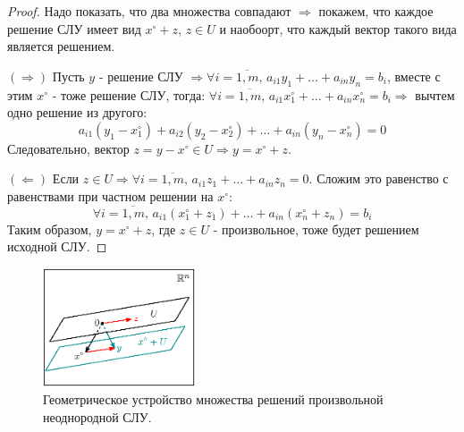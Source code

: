 \documentclass[12pt]{article}
\theoremstyle{definition}
\begin{document}
\begin{proof}
	Надо показать, что два множества совпадают $\Rightarrow$ покажем, что каждое решение СЛУ имеет вид $x^{\circ} + z, \, z \in U$ и наобоорт, что каждый вектор такого вида является решением.
	
	$(\Rightarrow)$ Пусть $y$ - решение СЛУ $\Rightarrow \forall i = \overline{1,m},\, a_{i1}y_1 +  \dotsc + a_{in}y_n = b_i$, вместе с этим $x^{\circ}$ - тоже решение СЛУ, тогда: $\forall i = \overline{1,m},\, a_{i1}x^{\circ}_1 +  \dotsc + a_{in}x^{\circ}_n = b_i \Rightarrow$ вычтем одно решение из другого:
	$$
		a_{i1}(y_1 - x^{\circ}_1) + a_{i2}(y_2 - x^{\circ}_2) + \dotsc + a_{in}(y_n - x^{\circ}_n) = 0
	$$
	Следовательно, вектор $z = y - x^{\circ} \in U \Rightarrow y = x^{\circ} + z$.
	
	$(\Leftarrow)$ Если $z \in U \Rightarrow \forall i = \overline{1,m}, \, a_{i1}z_1 + \dotsc + a_{in}z_n = 0$. Сложим это равенство с равенствами при частном решении на $x^{\circ}$:
	$$
		\forall i = \overline{1,m}, \, a_{i1}(x_1^{\circ} + z_1 ) + \dotsc + a_{in}(x_n^{\circ} + z_n) = b_i
	$$
	Таким образом, $y = x^{\circ} + z$, где $z \in U$ - произвольное, тоже будет решением исходной СЛУ.
\end{proof}
\begin{figure}[H]
	\centering
	\includegraphics[width=0.4\textwidth]{AL4_2.eps}
	\caption{Геометрическое устройство множества решений произвольной неоднородной СЛУ.}
	\label{4_2}
\end{figure}
\end{document}
